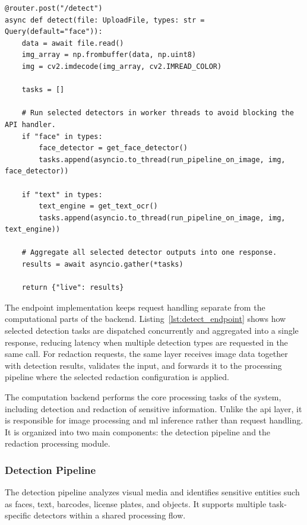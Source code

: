 \begin{lstlisting}[caption={Detection endpoint with parallel execution}, label={lst:detect_endpoint}]
@router.post("/detect")
async def detect(file: UploadFile, types: str = Query(default="face")):
    data = await file.read()
    img_array = np.frombuffer(data, np.uint8)
    img = cv2.imdecode(img_array, cv2.IMREAD_COLOR)

    tasks = []

    # Run selected detectors in worker threads to avoid blocking the API handler.
    if "face" in types:
        face_detector = get_face_detector()
        tasks.append(asyncio.to_thread(run_pipeline_on_image, img, face_detector))

    if "text" in types:
        text_engine = get_text_ocr()
        tasks.append(asyncio.to_thread(run_pipeline_on_image, img, text_engine))

    # Aggregate all selected detector outputs into one response.
    results = await asyncio.gather(*tasks)

    return {"live": results}
\end{lstlisting}

The endpoint implementation keeps request handling separate from the computational parts of the backend. Listing~\ref{lst:detect_endpoint} shows how selected detection tasks are dispatched concurrently and aggregated into a single response, reducing latency when multiple detection types are requested in the same call. For redaction requests, the same layer receives image data together with detection results, validates the input, and forwards it to the processing pipeline where the selected redaction configuration is applied.



The computation backend performs the core processing tasks of the system, including detection and redaction of sensitive information. Unlike the \acrshort{api} layer, it is responsible for image processing and \acrshort{ml} \gls{inference} rather than request handling. It is organized into two main components: the detection pipeline and the redaction processing module.

\subsubsection{Detection Pipeline}

The detection pipeline analyzes visual media and identifies sensitive entities such as faces, text, \gls{barcode}s, license plates, and objects. It supports multiple task-specific detectors within a shared processing flow.

